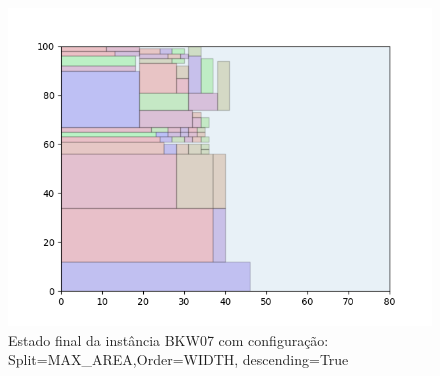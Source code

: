 \begin{figure}[H]
    \centering
    \caption[]{Estado final da instância BKW07 com configuração: Split=MAX_AREA,Order=WIDTH, descending=True}
    \label{fig:bkw07-max_area-width-true}
    \includegraphics[scale=0.5]{output/figures/bkw/bkw07/max_area/width/true/00}
\end{figure}